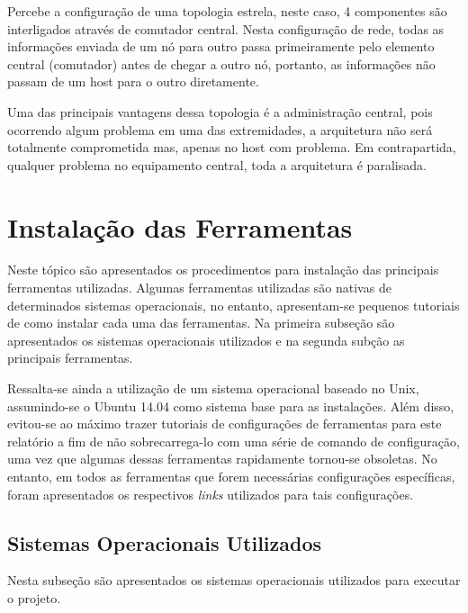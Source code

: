 		Percebe a configuração de uma topologia estrela, neste caso, 4 componentes são interligados através de comutador central. Nesta configuração de rede, todas as informações enviada de um nó para outro passa primeiramente pelo elemento central (comutador) antes de chegar a outro nó, portanto, as informações não passam de um host para o outro diretamente. \cite{Tanenbaum}

		Uma das principais vantagens dessa topologia é a administração central, pois ocorrendo algum problema em uma das extremidades, a arquitetura não será totalmente comprometida mas, apenas no host com problema. Em contrapartida, qualquer problema no equipamento central, toda a arquitetura é paralisada.

	\section{Instalação das Ferramentas}
	\label{sec:Arquitetura_Componentes}

		Neste tópico são apresentados os procedimentos para instalação das principais ferramentas utilizadas. Algumas ferramentas utilizadas são nativas de determinados sistemas operacionais, no entanto, apresentam-se pequenos tutoriais de como instalar cada uma das ferramentas. Na primeira subseção são apresentados os sistemas operacionais utilizados e na segunda subção as principais ferramentas.

		Ressalta-se ainda a utilização de um sistema operacional baseado no Unix, assumindo-se o Ubuntu 14.04 como sistema base para as instalações. Além disso, evitou-se ao máximo trazer tutoriais de configurações de ferramentas para este relatório a fim de não sobrecarrega-lo com uma série de comando de configuração, uma vez que algumas dessas ferramentas rapidamente tornou-se obsoletas. No entanto, em todos as ferramentas que forem necessárias configurações específicas, foram apresentados os respectivos \emph{links} utilizados para tais configurações.

		\subsection{Sistemas Operacionais Utilizados}
		\label{sec:Arquitetura_Componentes_SOU}

			Nesta subseção são apresentados os sistemas operacionais utilizados para executar o projeto.

